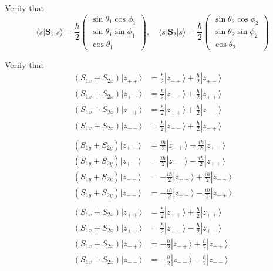 Verify that
\begin{equation*}
\langle s|\mathbf S_1|s\rangle
=\frac{\hbar}{2}\begin{pmatrix}
\sin\theta_1\cos\phi_1\\
\sin\theta_1\sin\phi_1\\
\cos\theta_1
\end{pmatrix},\quad
\langle s|\mathbf S_2|s\rangle
=\frac{\hbar}{2}\begin{pmatrix}
\sin\theta_2\cos\phi_2\\
\sin\theta_2\sin\phi_2\\
\cos\theta_2
\end{pmatrix}
\end{equation*}



\bigskip
Verify that
\begin{align*}
(S_{1x}+S_{2x})|z_{++}\rangle&=\tfrac{\hbar}{2}|z_{-+}\rangle+\tfrac{\hbar}{2}|z_{+-}\rangle
\\
(S_{1x}+S_{2x})|z_{+-}\rangle&=\tfrac{\hbar}{2}|z_{--}\rangle+\tfrac{\hbar}{2}|z_{++}\rangle
\\
(S_{1x}+S_{2x})|z_{-+}\rangle&=\tfrac{\hbar}{2}|z_{++}\rangle+\tfrac{\hbar}{2}|z_{--}\rangle
\\
(S_{1x}+S_{2x})|z_{--}\rangle&=\tfrac{\hbar}{2}|z_{+-}\rangle+\tfrac{\hbar}{2}|z_{-+}\rangle
\\
\\
(S_{1y}+S_{2y})|z_{++}\rangle&=\tfrac{i\hbar}{2}|z_{-+}\rangle+\tfrac{i\hbar}{2}|z_{+-}\rangle
\\
(S_{1y}+S_{2y})|z_{+-}\rangle&=\tfrac{i\hbar}{2}|z_{--}\rangle-\tfrac{i\hbar}{2}|z_{++}\rangle
\\
(S_{1y}+S_{2y})|z_{-+}\rangle&=-\tfrac{i\hbar}{2}|z_{++}\rangle+\tfrac{i\hbar}{2}|z_{--}\rangle
\\
(S_{1y}+S_{2y})|z_{--}\rangle&=-\tfrac{i\hbar}{2}|z_{+-}\rangle-\tfrac{i\hbar}{2}|z_{-+}\rangle
\\
\\
(S_{1x}+S_{2x})|z_{++}\rangle&=\tfrac{\hbar}{2}|z_{++}\rangle+\tfrac{\hbar}{2}|z_{++}\rangle
\\
(S_{1x}+S_{2x})|z_{+-}\rangle&=\tfrac{\hbar}{2}|z_{+-}\rangle-\tfrac{\hbar}{2}|z_{+-}\rangle
\\
(S_{1x}+S_{2x})|z_{-+}\rangle&=-\tfrac{\hbar}{2}|z_{-+}\rangle+\tfrac{\hbar}{2}|z_{-+}\rangle
\\
(S_{1x}+S_{2x})|z_{--}\rangle&=-\tfrac{\hbar}{2}|z_{--}\rangle-\tfrac{\hbar}{2}|z_{--}\rangle
\end{align*}


